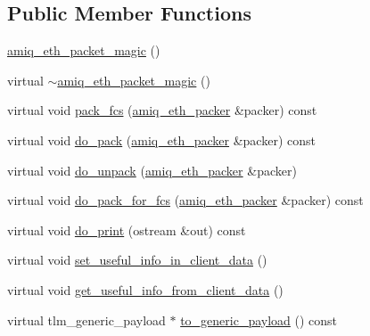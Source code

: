 \subsection*{Public Member Functions}
\begin{DoxyCompactItemize}
\item 
\hyperlink{classamiq__eth__packet__magic_ad980d72550a76056113b94a6e2105123}{amiq\_\-eth\_\-packet\_\-magic} ()
\item 
virtual \hyperlink{classamiq__eth__packet__magic_a56f19042d3acfd4cd22d05b25962936f}{$\sim$amiq\_\-eth\_\-packet\_\-magic} ()
\item 
virtual void \hyperlink{classamiq__eth__packet__magic_aad43e3e40b85ee732b3e883b85a63ca6}{pack\_\-fcs} (\hyperlink{classamiq__eth__packer}{amiq\_\-eth\_\-packer} \&packer) const 
\item 
virtual void \hyperlink{classamiq__eth__packet__magic_ad026a187c1d882aa1698a3b0d4209472}{do\_\-pack} (\hyperlink{classamiq__eth__packer}{amiq\_\-eth\_\-packer} \&packer) const 
\item 
virtual void \hyperlink{classamiq__eth__packet__magic_a400a90ae523af44eb0c38ba64ea6afe7}{do\_\-unpack} (\hyperlink{classamiq__eth__packer}{amiq\_\-eth\_\-packer} \&packer)
\item 
virtual void \hyperlink{classamiq__eth__packet__magic_a0a40225ac5c36e70f413cd6d8ffd9a24}{do\_\-pack\_\-for\_\-fcs} (\hyperlink{classamiq__eth__packer}{amiq\_\-eth\_\-packer} \&packer) const 
\item 
virtual void \hyperlink{classamiq__eth__packet__magic_a57354d611adb80b1a8f4ad00c4f307a3}{do\_\-print} (ostream \&out) const 
\item 
virtual void \hyperlink{classamiq__eth__packet__magic_a88cbdc3d686e90941c250d758a72c8be}{set\_\-useful\_\-info\_\-in\_\-client\_\-data} ()
\item 
virtual void \hyperlink{classamiq__eth__packet__magic_aa9451a4b2d3566114694bd4a578759da}{get\_\-useful\_\-info\_\-from\_\-client\_\-data} ()
\item 
virtual tlm\_\-generic\_\-payload $\ast$ \hyperlink{classamiq__eth__packet__magic_adfe68e5b2702826b23d606caf90ab2bc}{to\_\-generic\_\-payload} () const 
\end{DoxyCompactItemize}
